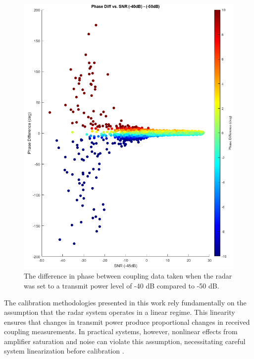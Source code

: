 \documentclass[journal]{IEEEtran}
\begin{document}
\begin{figure}[hptb]
    \centering
    \includegraphics[width=1\linewidth]{phaseDiff.png}
    \vspace{-0.2in}
    \caption{The difference in phase between coupling data taken when the radar was set to a transmit power level of -40 dB compared to -50 dB. }
    \label{fig:phaseDiffzoomout}
\end{figure}


The calibration methodologies presented in this work rely fundamentally on the assumption that the radar system operates in a linear regime. This linearity ensures that changes in transmit power produce proportional changes in received coupling measurements. In practical systems, however, nonlinear effects from amplifier saturation and noise can violate this assumption, necessitating careful system linearization before calibration \cite{sasser}.
\end{document}
